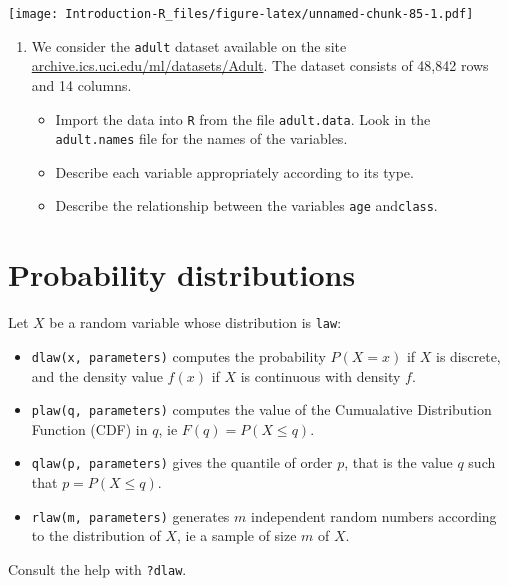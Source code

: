 \documentclass[]{book}
\providecommand{\tightlist}{%
  \setlength{\itemsep}{0pt}\setlength{\parskip}{0pt}}
\begin{document}
\texttt{[image: Introduction-R\_files/figure-latex/unnamed-chunk-85-1.pdf]}

\begin{enumerate}
\def\labelenumi{\arabic{enumi}.}
\setcounter{enumi}{1}
\tightlist
\item
  We consider the \texttt{adult} dataset available on the site \href{https://archive.ics.uci.edu/ml/datasets/Adult}{archive.ics.uci.edu/ml/datasets/Adult}. The dataset consists of 48,842 rows and 14 columns.

  \begin{itemize}
  \tightlist
  \item
    Import the data into \texttt{R} from the file \texttt{adult.data}. Look in the \texttt{adult.names} file for the names of the variables.
  \item
    Describe each variable appropriately according to its type.
  \item
    Describe the relationship between the variables \texttt{age} and\texttt{class}.
  \end{itemize}
\end{enumerate}

\hypertarget{probability-distributions}{%
\chapter{Probability distributions}\label{probability-distributions}}

Let \(X\) be a random variable whose distribution is \texttt{law}:

\begin{itemize}
\tightlist
\item
  \texttt{dlaw(x,\ parameters)} computes the probability \(P(X = x)\) if \(X\) is discrete, and the density value \(f(x)\) if \(X\) is continuous with density \(f\).
\item
  \texttt{plaw(q,\ parameters)} computes the value of the Cumualative Distribution Function (CDF) in \(q\), ie \(F(q) = P(X \leq q)\).
\item
  \texttt{qlaw(p,\ parameters)} gives the quantile of order \(p\), that is the value \(q\) such that \(p = P (X \leq q)\).
\item
  \texttt{rlaw(m,\ parameters)} generates \(m\) independent random numbers according to the distribution of \(X\), ie a sample of size \(m\) of \(X\).
\end{itemize}

Consult the help with \texttt{?dlaw}.
\end{document}

